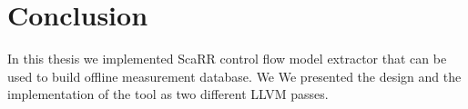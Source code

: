 
\chapter{Conclusion} %

\label{Chapter6} %

In this thesis we implemented ScaRR control flow model extractor that can be used to build offline measurement database. We We presented the design and the implementation of the tool as two different LLVM passes.